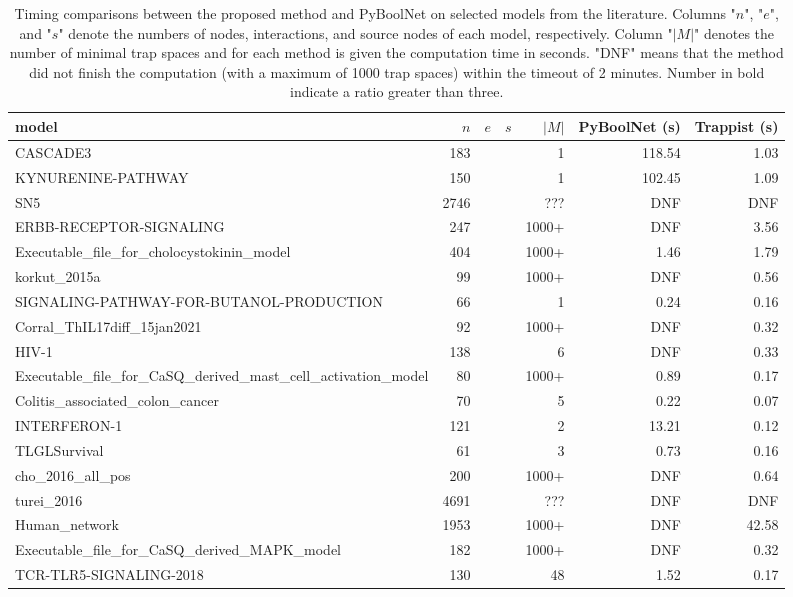 \documentclass[runningheads]{llncs}
\begin{document}
\begin{table}[!htb]
  \caption{Timing comparisons between the proposed method and PyBoolNet on selected models from the literature.
    Columns "\(n\)", "\(e\)", and "\(s\)" denote the numbers of nodes, interactions, and source nodes of each model, respectively. Column "\(|M|\)" denotes the number of minimal trap spaces and for each method is given the computation time in seconds.
    "DNF" means that the method did not finish the computation (with a maximum of 1000 trap spaces) within the timeout of 2 minutes. Number in bold indicate a ratio greater than three.}
  \centering
  \label{tab:selected_redone}
  \begin{tabular}{lrrrrrr}
    \toprule
    model & $n$ & $e$ & $s$ & $|M|$ & PyBoolNet (s) & Trappist (s) \\ \midrule
    CASCADE3 & 183 &&& 1 & 118.54 & 1.03\\
    KYNURENINE-PATHWAY & 150 &&& 1 & 102.45 & 1.09\\
    SN5 & 2746 &&& ??? & DNF & DNF\\
    ERBB-RECEPTOR-SIGNALING & 247 &&& 1000+ & DNF & 3.56\\
    Executable\_file\_for\_cholocystokinin\_model & 404 &&& 1000+ & 1.46 & 1.79\\
    korkut\_2015a & 99 &&& 1000+ & DNF & 0.56\\
    SIGNALING-PATHWAY-FOR-BUTANOL-PRODUCTION & 66 &&& 1 & 0.24 & 0.16\\
    Corral\_ThIL17diff\_15jan2021 & 92 &&& 1000+ & DNF & 0.32\\
    HIV-1 & 138 &&& 6 & DNF & 0.33\\
    Executable\_file\_for\_CaSQ\_derived\_mast\_cell\_activation\_model & 80 &&& 1000+ & 0.89 & 0.17\\
    Colitis\_associated\_colon\_cancer & 70 &&& 5 & 0.22 & 0.07\\
    INTERFERON-1 & 121 &&& 2 & 13.21 & 0.12\\
    TLGLSurvival & 61 &&& 3 & 0.73 & 0.16\\
    cho\_2016\_all\_pos & 200 &&& 1000+ & DNF & 0.64\\
    turei\_2016 & 4691 &&& ??? & DNF & DNF\\
    Human\_network & 1953 &&& 1000+ & DNF & 42.58\\
    Executable\_file\_for\_CaSQ\_derived\_MAPK\_model & 182 &&& 1000+ & DNF & 0.32\\
    TCR-TLR5-SIGNALING-2018 & 130 &&& 48 & 1.52 & 0.17\\

\end{tabular}
\end{table}
\end{document}
